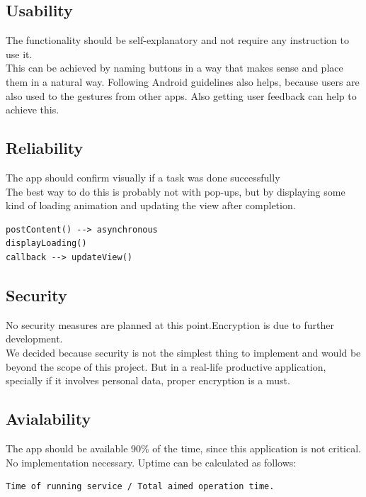 \documentclass[conference]{IEEEtran}
\numberwithin{figure}{subsection}
\begin{document}
\subsection{Usability}
The  functionality  should  be  self-explanatory and not require any instruction to use it.\\

This can be achieved by naming buttons in a way that makes sense and place them in a natural way. Following Android guidelines also helps, because users are also used to the gestures from other apps. Also getting user feedback can help to achieve this.\\


\subsection{Reliability}
The  app  should  confirm  visually  if  a  task was done successfully\\

The best way to do this is probably not with pop-ups, but by displaying some kind of loading animation and updating the view after completion.

\begin{lstlisting}
postContent() --> asynchronous
displayLoading()
callback --> updateView()
\end{lstlisting}


\subsection{Security}
No security measures are planned at this point.Encryption is due to further development.\\

We decided because security is not the simplest thing to implement and would be beyond the scope of this project. But in a real-life productive application, specially if it involves personal data, proper encryption is a must.\\


\subsection{Avialability}
The  app  should  be  available  90\%  of  the time, since this application is not critical.\\

No implementation necessary. Uptime can be calculated as follows:

\begin{lstlisting}
Time of running service / Total aimed operation time.
\end{lstlisting}
\end{document}
